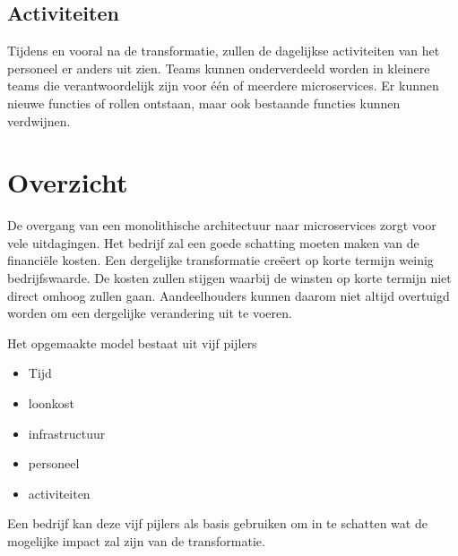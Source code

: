 \subsection{Activiteiten}

Tijdens en vooral na de transformatie, zullen de dagelijkse activiteiten van het personeel er anders uit zien. Teams kunnen onderverdeeld worden in kleinere teams die verantwoordelijk zijn voor één of meerdere microservices. Er kunnen nieuwe functies of rollen ontstaan, maar ook bestaande functies kunnen verdwijnen.  

\section{Overzicht}

De overgang van een monolithische architectuur naar microservices zorgt voor vele uitdagingen. Het bedrijf zal een goede schatting moeten maken van de financiële kosten. Een dergelijke transformatie creëert op korte termijn weinig bedrijfswaarde. De kosten zullen stijgen waarbij de winsten op korte termijn niet direct omhoog zullen gaan. Aandeelhouders kunnen daarom niet altijd overtuigd worden om een dergelijke verandering uit te voeren.

Het opgemaakte model bestaat uit vijf pijlers
\begin{itemize}
    \item Tijd
    \item loonkost
    \item infrastructuur
    \item personeel
    \item activiteiten
\end{itemize}

Een bedrijf kan deze vijf pijlers als basis gebruiken om in te schatten wat de mogelijke impact zal zijn van de transformatie.

